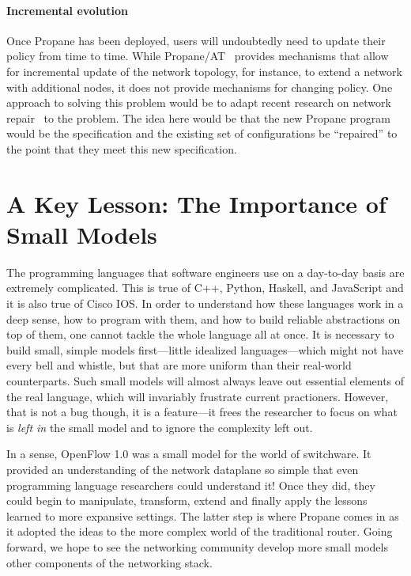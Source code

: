 \documentclass[10pt]{sigalternate052015}
\begin{document}
\paragraph*{Incremental evolution}
Once Propane has been deployed, users will undoubtedly need to update
their policy from time to time.  While
Propane/AT~\cite{abstract-propane} provides mechanisms that allow for
incremental update of the network topology, for instance, to extend a
network with additional nodes, it does not provide mechanisms for
changing policy.  One approach to solving this problem would be to
adapt recent research on network repair~\cite{Gember-Jacobson:SOSP17}
to the problem.  The idea here would be that the new Propane
program would be the specification and the existing set of
configurations be ``repaired'' to the point that they meet this new specification.

\section{A Key Lesson:  The Importance of Small Models}
\label{sec:conclusions}

The programming languages that software engineers use on a day-to-day
basis are extremely complicated.  This is true of C++, Python, Haskell, and
JavaScript and it is also true of Cisco IOS.  In order to understand
how these languages work in a deep sense, how to program with them,
and how to build reliable abstractions on top of them, one cannot
tackle the whole language all at once.  It is necessary to build
small, simple models first---little idealized languages---which might
not have every bell and whistle, but that are more uniform than their
real-world counterparts.  Such
small models will almost always leave out essential elements of the
real language, which will invariably frustrate current practioners.
However, that is
not a bug though, it is a feature---it frees the researcher to focus on
what is \emph{left in} the small model and to ignore the complexity left out.

In a sense, OpenFlow 1.0 was a small model for the world of
switchware.  It provided an understanding of the network dataplane so
simple that even programming language researchers could understand it!
Once they did, they could begin to manipulate, transform, extend and
finally apply the lessons learned to more expansive settings.  The
latter step is where Propane comes in as it adopted the ideas to the
more complex world of the traditional router.  Going forward, we hope
to see the networking community develop more small models other
components of the networking stack.
\end{document}
